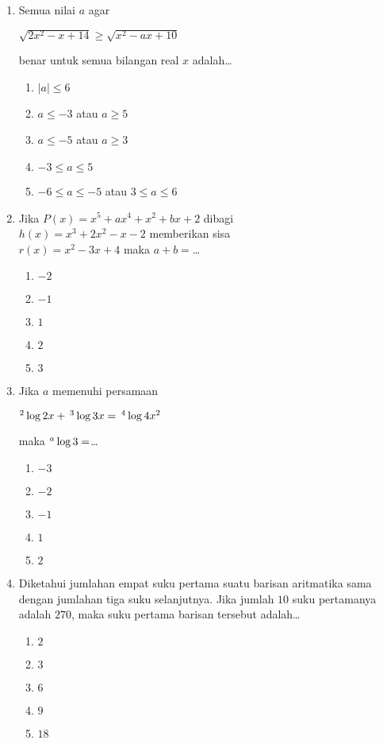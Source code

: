 \documentclass[A4,12PT, english, twocolumn]{journal}
\begin{document}
\begin{enumerate}
\item Semua nilai $a$ agar
\begin{center}
    $\sqrt{2x^2-x+14} \geq \sqrt{x^2-ax+10}$
\end{center}
benar untuk semua bilangan real $x$ adalah\dots
    \begin{enumerate}
        \item $\left|a \right| \leq 6$
        \item $a \leq -3$ atau $a \geq 5$
        \item $a \leq -5$ atau $a \geq 3$
        \item $-3 \leq a \leq 5$
        \item $-6 \leq a \leq -5$ atau $3 \leq a \leq 6$
    \end{enumerate}

\item Jika $P(x)=x^5+ax^4+x^2+bx+2$ dibagi \\ $h(x)=x^3+2x^2-x-2$ memberikan sisa \\ $r(x)=x^2-3x+4$ maka $a+b=$\dots
    \begin{enumerate}
        \item $-2$
        \item $-1$
        \item $1$
        \item $2$
        \item $3$
    \end{enumerate}

\item Jika $a$ memenuhi persamaan
\begin{center}
    $^2\Log{2x}+ \, ^3\Log{3x}= \, ^4\Log{4x^2}$
\end{center}
maka $^a\Log{3}=$\dots
    \begin{enumerate}
        \item $-3$
        \item $-2$
        \item $-1$
        \item $1$
        \item $2$
    \end{enumerate}

\item Diketahui jumlahan empat suku pertama suatu barisan aritmatika sama dengan jumlahan tiga suku selanjutnya. Jika jumlah $10$ suku pertamanya adalah $270$, maka suku pertama barisan tersebut adalah\dots
    \begin{enumerate}
        \item $2$
        \item $3$
        \item $6$
        \item $9$
        \item $18$
    \end{enumerate}


\end{enumerate}
\end{document}
